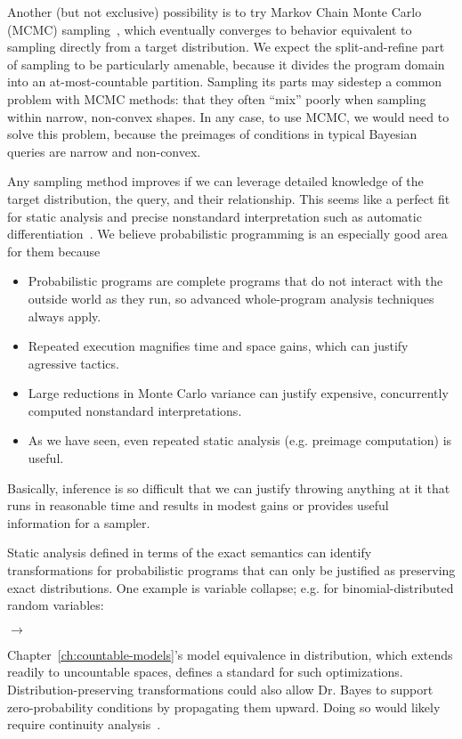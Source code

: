 Another (but not exclusive) possibility is to try Markov Chain Monte Carlo (MCMC) sampling~\cite[Chapter 12]{cit:degroot-2012book-probability}, which eventually converges to behavior equivalent to sampling directly from a target distribution.
We expect the split-and-refine part of sampling to be particularly amenable, because it divides the program domain into an at-most-countable partition.
Sampling its parts may sidestep a common problem with MCMC methods: that they often ``mix'' poorly when sampling within narrow, non-convex shapes.
In any case, to use MCMC, we would need to solve this problem, because the preimages of conditions in typical Bayesian queries are narrow and non-convex.

Any sampling method improves if we can leverage detailed knowledge of the target distribution, the query, and their relationship.
This seems like a perfect fit for static analysis and precise nonstandard interpretation such as automatic differentiation~\cite{cit:elliott-2009icfp-differentiation}.
We believe probabilistic programming is an especially good area for them because
\begin{itemize}
	\item Probabilistic programs are complete programs that do not interact with the outside world as they run, so advanced whole-program analysis techniques always apply.
	\item Repeated execution magnifies time and space gains, which can justify agressive tactics.
	\item Large reductions in Monte Carlo variance can justify expensive, concurrently computed nonstandard interpretations.
	\item As we have seen, even repeated static analysis (e.g. preimage computation) is useful.
\end{itemize}
Basically, inference is so difficult that we can justify throwing anything at it that runs in reasonable time and results in modest gains or provides useful information for a sampler.

Static analysis defined in terms of the exact semantics can identify transformations for probabilistic programs that can only be justified as preserving exact distributions.
One example is variable collapse; e.g. for binomial-distributed random variables:
\begin{center}
 \tab $\longrightarrow$ \tab {}
\end{center}
Chapter~\ref{ch:countable-models}'s model equivalence in distribution, which extends readily to uncountable spaces, defines a standard for such optimizations.
Distribution-preserving transformations could also allow Dr. Bayes to support zero-probability conditions by propagating them upward.
Doing so would likely require continuity analysis~\cite{cit:chaudhuri-2010-continuity}.

